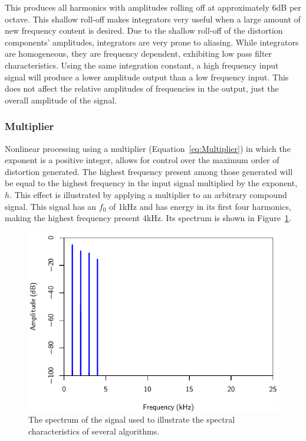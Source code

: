 			This produces all harmonics with amplitudes rolling off at approximately 6dB per octave. This
			shallow roll-off makes integrators very useful when a large amount of new frequency content is
			desired. Due to the shallow roll-off of the distortion components' amplitudes, integrators are very
			prone to aliasing. While integrators are homogeneous, they are frequency dependent, exhibiting low
			pass filter characteristics. Using the same integration constant, a high frequency input signal
			will produce a lower amplitude output than a low frequency input. This does not affect the
			relative amplitudes of frequencies in the output, just the overall amplitude of the signal.

		\subsubsection*{Multiplier}
			Nonlinear processing using a multiplier (Equation~\ref{eq:Multiplier}) in which the exponent is a
			positive integer, allows for control over the maximum order of distortion generated. The highest
			frequency present among those generated will be equal to the highest frequency in the input signal
			multiplied by the exponent, $h$. This effect is illustrated by applying a multiplier to an
			arbitrary compound signal. This signal has an $f_{0}$ of 1kHz and has energy in its first four
			harmonics, making the highest frequency present 4kHz. Its spectrum is shown in
			Figure~\ref{fig:FourHarmonics}.

			\begin{figure}[h!]
				\centering
				\includegraphics{chapter5/Images/FourHarmonics.pdf}
				\caption{The spectrum of the signal used to illustrate the spectral characteristics of
					several algorithms.}
				\label{fig:FourHarmonics}
			\end{figure}
			
